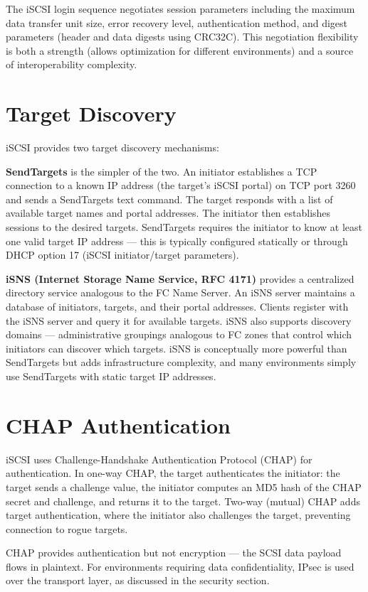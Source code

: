 The iSCSI login sequence negotiates session parameters including the maximum data transfer unit size, error recovery level, authentication method, and digest parameters (header and data digests using CRC32C). This negotiation flexibility is both a strength (allows optimization for different environments) and a source of interoperability complexity.

\section{Target Discovery}
iSCSI provides two target discovery mechanisms:

\textbf{SendTargets} is the simpler of the two. An initiator establishes a TCP connection to a known IP address (the target's iSCSI portal) on TCP port 3260 and sends a SendTargets text command. The target responds with a list of available target names and portal addresses. The initiator then establishes sessions to the desired targets. SendTargets requires the initiator to know at least one valid target IP address --- this is typically configured statically or through DHCP option 17 (iSCSI initiator/target parameters).

\textbf{iSNS (Internet Storage Name Service, RFC 4171)} provides a centralized directory service analogous to the FC Name Server. An iSNS server maintains a database of initiators, targets, and their portal addresses. Clients register with the iSNS server and query it for available targets. iSNS also supports discovery domains --- administrative groupings analogous to FC zones that control which initiators can discover which targets. iSNS is conceptually more powerful than SendTargets but adds infrastructure complexity, and many environments simply use SendTargets with static target IP addresses.

\section{CHAP Authentication}
iSCSI uses Challenge-Handshake Authentication Protocol (CHAP) for authentication. In one-way CHAP, the target authenticates the initiator: the target sends a challenge value, the initiator computes an MD5 hash of the CHAP secret and challenge, and returns it to the target. Two-way (mutual) CHAP adds target authentication, where the initiator also challenges the target, preventing connection to rogue targets.

CHAP provides authentication but not encryption --- the SCSI data payload flows in plaintext. For environments requiring data confidentiality, IPsec is used over the transport layer, as discussed in the security section.

